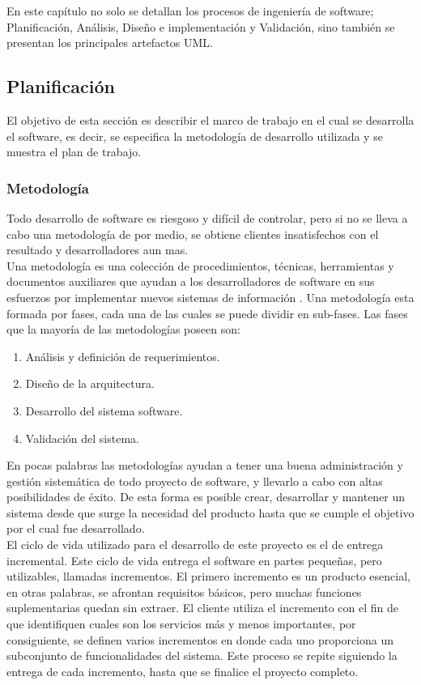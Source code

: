 En este capítulo no solo se detallan los  procesos de ingeniería de software; Planificación, Análisis, Diseño e implementación y Validación, sino también se presentan los principales 	artefactos UML.

 
\subsection{Planificación}
	
	El objetivo de esta sección es describir el marco de trabajo en el cual se desarrolla el software, es decir,  se especifica la metodología de desarrollo utilizada y se muestra el plan de trabajo.
	
	
	\subsubsection{Metodología}
	Todo desarrollo de software es riesgoso y difícil de controlar, pero si no se lleva a cabo una metodología de por medio, se obtiene clientes insatisfechos con el resultado y desarrolladores aun mas. 
	\\

	
	
	Una metodología es una colección de procedimientos, técnicas, herramientas y documentos auxiliares que ayudan a los desarrolladores de software en sus esfuerzos por implementar nuevos sistemas de información \cite{GOM10}. Una metodología esta formada por fases, cada	una de las cuales se puede dividir en sub-fases. Las fases que la mayoría de las metodologías poseen son:
	\begin{enumerate}
		\item Análisis y definición de requerimientos.
		\item Diseño de la arquitectura.
		\item Desarrollo del sistema software.
		\item Validación del sistema.
	\end{enumerate}
	
	
	En pocas palabras las metodologías ayudan a tener una buena administración y gestión sistemática de todo proyecto de software, y llevarlo a cabo con altas posibilidades de éxito. De esta forma es posible crear, desarrollar y mantener un sistema desde que surge la necesidad del producto hasta que se cumple el objetivo por el cual fue desarrollado.
	\\

	El ciclo de vida utilizado para el desarrollo de este proyecto es el de entrega incremental. Este ciclo de vida entrega el software en partes pequeñas, pero utilizables, llamadas incrementos. El primero incremento es un producto esencial, en otras palabras, se afrontan requisitos básicos, pero muchas funciones suplementarias quedan sin extraer. El cliente utiliza el incremento con el fin de que identifiquen cuales son los servicios más y menos importantes, por consiguiente, se definen varios incrementos en donde cada uno proporciona un subconjunto de funcionalidades del sistema. Este proceso se repite siguiendo la entrega de cada incremento, hasta que se finalice el proyecto completo.
	

